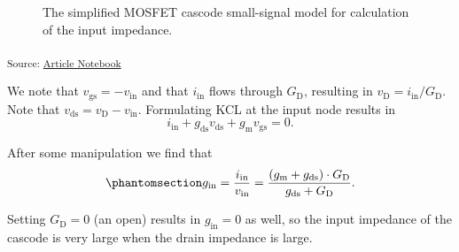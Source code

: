 \documentclass[
  a4paper,
  DIV=11,
  numbers=noendperiod]{scrartcl}
\begin{document}
\begin{figure}[H]


\caption{\label{fig-cascode-small-signal-simplified-in}The simplified
MOSFET cascode small-signal model for calculation of the input
impedance.}

\end{figure}%

\textsubscript{Source:
\href{https://iic-jku.github.io/analog-circuit-design/index.qmd.html}{Article
Notebook}}

We note that \(v_\mathrm{gs}= -v_\mathrm{in}\) and that
\(i_\mathrm{in}\) flows through \(G_\mathrm{D}\), resulting in
\(v_\mathrm{D} = i_\mathrm{in} / G_\mathrm{D}\). Note that
\(v_\mathrm{ds}=  v_\mathrm{D} - v_\mathrm{in}\). Formulating KCL at the
input node results in \[
i_\mathrm{in} + g_\mathrm{ds}v_\mathrm{ds}+ g_\mathrm{m}v_\mathrm{gs}= 0.
\]

After some manipulation we find that
\begin{equation}\phantomsection\label{eq-cascode-input}{
g_\mathrm{in} = \frac{i_\mathrm{in}}{v_\mathrm{in}} = \frac{(g_\mathrm{m}+ g_\mathrm{ds}) \cdot G_\mathrm{D}}{g_\mathrm{ds}+ G_\mathrm{D}}.
}\end{equation}

Setting \(G_\mathrm{D} = 0\) (an open) results in \(g_\mathrm{in} = 0\)
as well, so the input impedance of the cascode is very large when the
drain impedance is large.
\end{document}
